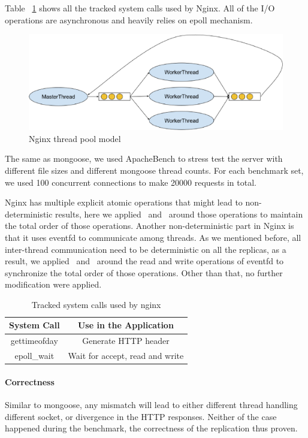 Table ~\ref{t:nginx_syscall} shows all the tracked system calls used by Nginx. All of the I/O operations are asynchronous and heavily relies on epoll mechanism. 

\begin{figure}
\centering
\includegraphics[width=0.8\columnwidth]{figures/nginx_model}
\caption{Nginx thread pool model}
\label{f:nginx_model}
\end{figure}

The same as mongoose, we used ApacheBench to stress test the server with different file sizes and different mongoose thread counts. For each benchmark set, we used 100 concurrent connections to make 20000 requests in total.

Nginx has multiple explicit atomic operations that might lead to non-deterministic results, here we applied \detstart\ and \detend\ around those operations to maintain the total order of those operations. Another non-deterministic part in Nginx is that it uses eventfd to communicate among threads. As we mentioned before, all inter-thread communication need to be deterministic on all the replicas, as a result, we applied \detstart\ and \detend\ around the read and write operations of eventfd to synchronize the total order of those operations. Other than that, no further modification were applied.

\begin{table}
\caption{Tracked system calls used by nginx}
\begin{center}
 \begin{tabular}{c | c }
System Call & Use in the Application\\ \hline
 gettimeofday & Generate HTTP header\\ \hline
 epoll\_wait & Wait for accept, read and write
 \end{tabular}
\end{center}
\label{t:nginx_syscall}
\end{table}

\paragraph{Correctness} Similar to mongoose, any mismatch will lead to either different thread handling different socket, or divergence in the HTTP responses. Neither of the case happened during the benchmark, the correctness of the replication thus proven.

